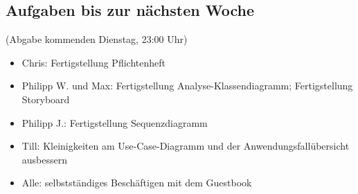 \documentclass[12pt,a4paper]{article}
\begin{document}
\subsection*{Aufgaben bis zur nächsten Woche}
(Abgabe kommenden Dienstag, 23:00 Uhr)
\medskip
\begin{itemize}
\item Chris: Fertigstellung Pflichtenheft
\item Philipp W. und Max: Fertigstellung Analyse-Klassendiagramm; Fertigstellung Storyboard
\item Philipp J.: Fertigstellung Sequenzdiagramm
\item Till: Kleinigkeiten am Use-Case-Diagramm und der Anwendungsfallübersicht ausbessern
\item Alle: selbstständiges Beschäftigen mit dem Guestbook
\end{itemize}
\end{document}
